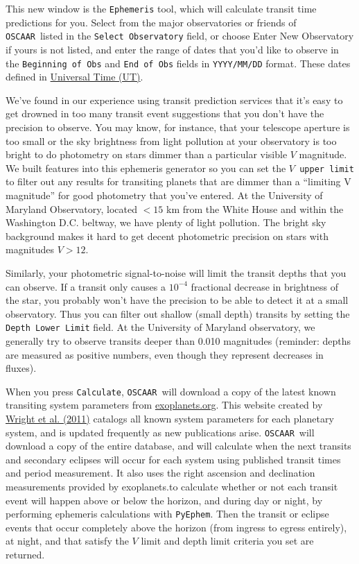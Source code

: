 \documentclass[a4paper]{article}
\newcommand{\code}[1]{\texttt{#1}}
\newcommand{\oscaar}{\code{OSCAAR}~}
\begin{document}
This new window is the \code{Ephemeris} tool, which will calculate transit time predictions for you. Select from the major observatories or friends of \oscaar listed in the \code{Select Observatory} field, or choose Enter New Observatory if yours is not listed, and enter the range of dates that you'd like to observe in the \code{Beginning of Obs} and \code{End of Obs} fields in \code{YYYY/MM/DD} format.  These dates defined in \href{http://en.wikipedia.org/wiki/Universal_time}{Universal Time (UT)}.

We've found in our experience using transit prediction services that it's easy to get drowned in too many transit event suggestions that you don't have the precision to observe. You may know, for instance, that your telescope aperture is too small or the sky brightness from light pollution at your observatory is too bright to do photometry on stars dimmer than a particular visible $V$ magnitude. We built features into this ephemeris generator so you can set the \code{$V$ upper limit} to filter out any results for transiting planets that are dimmer than a ``limiting V magnitude'' for good photometry that you've entered. At the University of Maryland Observatory, located $<15$ km from the White House and within the Washington D.C. beltway, we have plenty of light pollution. The bright sky background makes it hard to get decent photometric precision on stars with magnitudes $V>12$.

Similarly, your photometric signal-to-noise will limit the transit depths that you can observe. If a transit only causes a $10^{-4}$ fractional decrease in brightness of the star, you probably won't have the precision to be able to detect it at a small observatory. Thus you can filter out shallow (small depth) transits by setting the \code{Depth Lower Limit} field. At the University of Maryland observatory, we generally try to observe transits deeper than 0.010 magnitudes (reminder: depths are measured as positive numbers, even though they represent decreases in fluxes).

When you press \code{Calculate}, \oscaar will download a copy of the latest known transiting system parameters from \href{http://www.exoplanets.org/}{exoplanets.org}. This website created by \href{http://adsabs.harvard.edu/abs/2011PASP..123..412W}{Wright et al. (2011)} catalogs all known system parameters for each planetary system, and is updated frequently as new publications arise. \oscaar will download a copy of the entire database, and will calculate when the next transits and secondary eclipses will occur for each system using published transit times and period measurement. It also uses the right ascension and declination measurements provided by exoplanets.\@org to calculate whether or not each transit event will happen above or below the horizon, and during day or night, by performing ephemeris calculations with \code{PyEphem}. Then the transit or eclipse events that occur completely above the horizon (from ingress to egress entirely), at night, and that satisfy the $V$ limit and depth limit criteria you set are returned. 
\end{document}
